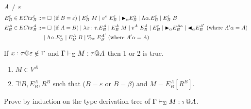 $A \neq \varepsilon$\\
\begin{align*}
	E^\varepsilon_B \in ECtx^\varepsilon_B & ::= \square\ (\text{if\ } B = \varepsilon) \mid E^\varepsilon_B\ M \mid v^e\ E^\varepsilon_B 
	\mid {\mathop{\blacktriangleright}}_\alpha E^\alpha_B \mid \Lambda\alpha.E^\varepsilon_B
	\mid E^\varepsilon_B\ B                                                                                                     \\
	E^A_B \in ECtx^A_B                     & ::= \square\ (\text{if } A = B) \mid \lambda x:\tau.E^A_B \mid E^A_B\ M \mid v^A\ E^A_B      
	\mid E^\varepsilon_B \mid {\mathop{\blacktriangleright}}_\alpha E^{A\alpha}_B
	\mid {\mathop{\blacktriangleleft}}_\alpha E^{A'}_B \ (\text{where } A'\alpha = A)                                                                              \\
	                                       & \quad \mid \Lambda\alpha.E^\varepsilon_B                                                     
	\mid E^A_B\ B \mid \%_\alpha\ E^{A'}_B \ (\text{where } A'\alpha = A)                                                       \\
\end{align*}
	
\begin{lemma}
	If $x:\tau@\varepsilon \notin \G$ and $\Gamma \vdash_\Sigma M : \tau @ A$ then 1 or 2 is true.
	\begin{enumerate}
		\item $ M \in V^A$
		\item $\exists ! B, E^A_B, R^B$ such that ($B = \varepsilon$ or $B = \beta$) and $M = E^A_B[R^B]$.
	\end{enumerate}
\end{lemma}
	
Prove by induction on the type derivation tree of $\G \V M:\tau@A$.
	
